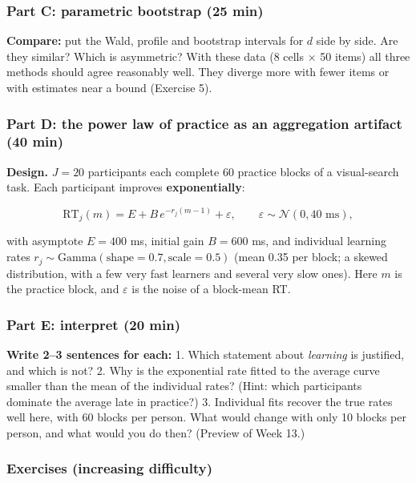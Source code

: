 \subsubsection{Part C: parametric bootstrap (25 min)}

\textbf{Compare:} put the Wald, profile and bootstrap intervals for
\(d\) side by side. Are they similar? Which is asymmetric? With these
data (8 cells × 50 items) all three methods should agree reasonably
well. They diverge more with fewer items or with estimates near a bound
(Exercise 5).

\subsubsection{Part D: the power law of practice as an aggregation
artifact (40 min)}

\textbf{Design.} \(J = 20\) participants each complete 60 practice
blocks of a visual-search task. Each participant improves
\textbf{exponentially}:

\[
\mathrm{RT}_j(m) = E + B\,e^{-r_j (m-1)} + \varepsilon, \qquad \varepsilon \sim \mathcal{N}(0, 40 \text{ ms}),
\]

with asymptote \(E = 400\) ms, initial gain \(B = 600\) ms, and
individual learning rates
\(r_j \sim \mathrm{Gamma}(\text{shape} = 0.7, \text{scale} = 0.5)\)
(mean 0.35 per block; a skewed distribution, with a few very fast
learners and several very slow ones). Here \(m\) is the practice block,
and \(\varepsilon\) is the noise of a block-mean RT.

\subsubsection{Part E: interpret (20 min)}

\textbf{Write 2--3 sentences for each:} 1. Which statement about
\emph{learning} is justified, and which is not? 2. Why is the
exponential rate fitted to the average curve smaller than the mean of
the individual rates? (Hint: which participants dominate the average
late in practice?) 3. Individual fits recover the true rates well here,
with 60 blocks per person. What would change with only 10 blocks per
person, and what would you do then? (Preview of Week 13.)

\subsubsection{Exercises (increasing difficulty)}

